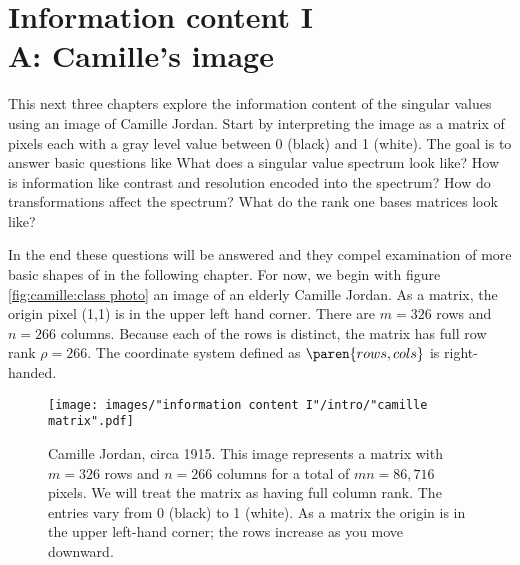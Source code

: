 \chapter[Information content I\\A: Camille's image]{Information content I\\A: Camille's image}

This next three chapters explore the information content of the singular values using an image of Camille Jordan. Start by interpreting the image as a matrix of pixels each with a gray level value between 0 (black) and 1 (white). The goal is to answer basic questions like What does a singular value spectrum look like? How is information like contrast and resolution encoded into the spectrum? How do transformations affect the spectrum? What do the rank one bases matrices look like?

In the end these questions will be answered and they compel examination of more basic shapes of in the following chapter. For now, we begin with figure \eqref{fig:camille:class photo} an image of an elderly Camille Jordan. As a matrix, the origin pixel (1,1) is in the upper left hand corner. There are $m=326$ rows and $n=266$ columns. Because each of the rows is distinct, the matrix has full row rank $\rho = 266$. The coordinate system defined as $\paren{rows,cols}$ is right-handed.

\begin{figure}[htbp] %
   \centering
   \texttt{[image: images/"information content I"/intro/"camille matrix".pdf]} 
   \caption[Camille Jordan, circa 1915]{Camille Jordan, circa 1915. This image represents a matrix with $m = 326$ rows and $n = 266$ columns for a total of $mn=86,716$ pixels. We will treat the matrix as having full column rank. The entries vary from 0 (black) to 1 (white). As a matrix the origin is in the upper left-hand corner; the rows increase as you move downward.}
   \label{fig:camille:class photo}
\end{figure}

%






\endinput